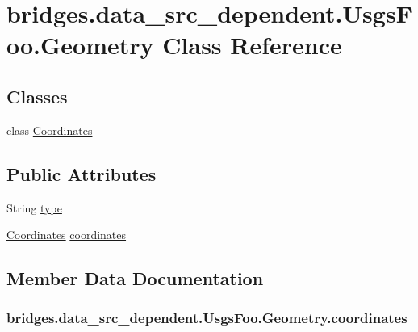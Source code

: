 \hypertarget{classbridges_1_1data__src__dependent_1_1_usgs_foo_1_1_geometry}{}\section{bridges.\+data\+\_\+src\+\_\+dependent.\+Usgs\+Foo.\+Geometry Class Reference}
\label{classbridges_1_1data__src__dependent_1_1_usgs_foo_1_1_geometry}
\subsection*{Classes}
\begin{DoxyCompactItemize}
\item 
class \hyperlink{classbridges_1_1data__src__dependent_1_1_usgs_foo_1_1_geometry_1_1_coordinates}{Coordinates}
\end{DoxyCompactItemize}
\subsection*{Public Attributes}
\begin{DoxyCompactItemize}
\item 
String \hyperlink{classbridges_1_1data__src__dependent_1_1_usgs_foo_1_1_geometry_a985b3a46dad2fcd4e798d2f51198bcfd}{type}
\item 
\hyperlink{classbridges_1_1data__src__dependent_1_1_usgs_foo_1_1_geometry_1_1_coordinates}{Coordinates} \hyperlink{classbridges_1_1data__src__dependent_1_1_usgs_foo_1_1_geometry_a339e388c47a5d03c946c875d690ee514}{coordinates}
\end{DoxyCompactItemize}


\subsection{Member Data Documentation}
\hypertarget{classbridges_1_1data__src__dependent_1_1_usgs_foo_1_1_geometry_a339e388c47a5d03c946c875d690ee514}{}
\subsubsection[{coordinates}]{ bridges.\+data\+\_\+src\+\_\+dependent.\+Usgs\+Foo.\+Geometry.\+coordinates}\label{classbridges_1_1data__src__dependent_1_1_usgs_foo_1_1_geometry_a339e388c47a5d03c946c875d690ee514}
\hypertarget{classbridges_1_1data__src__dependent_1_1_usgs_foo_1_1_geometry_a985b3a46dad2fcd4e798d2f51198bcfd}{}
